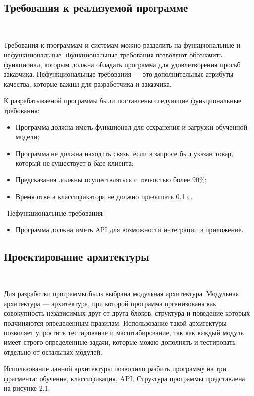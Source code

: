 \
\subsection{Требования к реализуемой программе}
\

Требования к программам и системам можно разделить на функциональные и нефункциональные. Функциональные требования позволяют обозначить функционал, которым должна обладать программа для удовлетворения просьб заказчика. Нефункциональные требования — это дополнительные атрибуты качества, которые важны для разработчика и заказчика.

К разрабатываемой программы были поставлены следующие функциональные требования:

\begin{itemize}
  \item Программа должна иметь функционал для сохранения и загрузки обученной модели;
  \item Программа не должна находить связь, если в запросе был указан товар, который не существует в базе клиента;
  \item Предсказания должны осуществляться с точностью более 90\%;
  \item Время ответа классификатора не должно превышать 0.1 с.
\end{itemize}

\
Нефункциональные требования:
\begin{itemize}
  \item Программа должна иметь API для возможности интеграции в приложение.
\end{itemize}

\newpage

\subsection{Проектирование архитектуры}
\

Для разработки программы была выбрана модульная архитектура. Модульная архитектура — архитектура, при которой программа организована как совокупность независимых друг от друга блоков, структура и поведение которых подчиняются определенным правилам. Использование такой архитектуры позволяет упростить тестирование и масштабирование, так как каждый модуль имеет строго определенные задачи, которые можно дополнять и тестировать отдельно от остальных модулей.

Использование данной архитектуры позволило разбить программу на три фрагмента: обучение, классификация, API. Структура программы представлена на рисунке 2.1.


